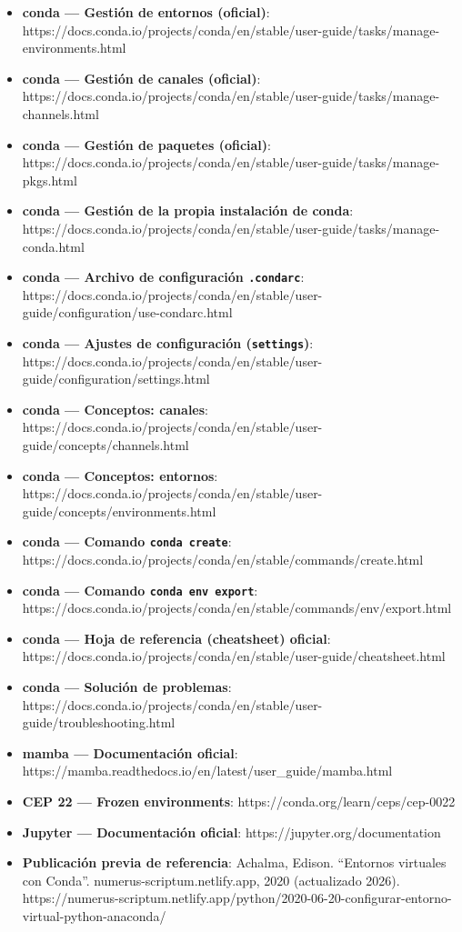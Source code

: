 \documentclass[
  doc,
  floatsintext,
  longtable,
  a4paper,
  nolmodern,
  notxfonts,
  notimes,
  12pt,
  colorlinks=true,linkcolor=blue,citecolor=blue,urlcolor=blue]{apa7}
\providecommand{\tightlist}{%
  \setlength{\itemsep}{0pt}\setlength{\parskip}{0pt}}
\begin{document}
\begin{itemize}
\tightlist
\item
  \textbf{conda --- Gestión de entornos (oficial)}:
  https://docs.conda.io/projects/conda/en/stable/user-guide/tasks/manage-environments.html
\item
  \textbf{conda --- Gestión de canales (oficial)}:
  https://docs.conda.io/projects/conda/en/stable/user-guide/tasks/manage-channels.html
\item
  \textbf{conda --- Gestión de paquetes (oficial)}:
  https://docs.conda.io/projects/conda/en/stable/user-guide/tasks/manage-pkgs.html
\item
  \textbf{conda --- Gestión de la propia instalación de conda}:
  https://docs.conda.io/projects/conda/en/stable/user-guide/tasks/manage-conda.html
\item
  \textbf{conda --- Archivo de configuración \texttt{.condarc}}:
  https://docs.conda.io/projects/conda/en/stable/user-guide/configuration/use-condarc.html
\item
  \textbf{conda --- Ajustes de configuración (\texttt{settings})}:
  https://docs.conda.io/projects/conda/en/stable/user-guide/configuration/settings.html
\item
  \textbf{conda --- Conceptos: canales}:
  https://docs.conda.io/projects/conda/en/stable/user-guide/concepts/channels.html
\item
  \textbf{conda --- Conceptos: entornos}:
  https://docs.conda.io/projects/conda/en/stable/user-guide/concepts/environments.html
\item
  \textbf{conda --- Comando \texttt{conda\ create}}:
  https://docs.conda.io/projects/conda/en/stable/commands/create.html
\item
  \textbf{conda --- Comando \texttt{conda\ env\ export}}:
  https://docs.conda.io/projects/conda/en/stable/commands/env/export.html
\item
  \textbf{conda --- Hoja de referencia (cheatsheet) oficial}:
  https://docs.conda.io/projects/conda/en/stable/user-guide/cheatsheet.html
\item
  \textbf{conda --- Solución de problemas}:
  https://docs.conda.io/projects/conda/en/stable/user-guide/troubleshooting.html
\item
  \textbf{mamba --- Documentación oficial}:
  https://mamba.readthedocs.io/en/latest/user\_guide/mamba.html
\item
  \textbf{CEP 22 --- Frozen environments}:
  https://conda.org/learn/ceps/cep-0022
\item
  \textbf{Jupyter --- Documentación oficial}:
  https://jupyter.org/documentation
\item
  \textbf{Publicación previa de referencia}: Achalma, Edison. ``Entornos
  virtuales con Conda''. numerus-scriptum.netlify.app, 2020 (actualizado
  2026).
  https://numerus-scriptum.netlify.app/python/2020-06-20-configurar-entorno-virtual-python-anaconda/
\end{itemize}
\end{document}
